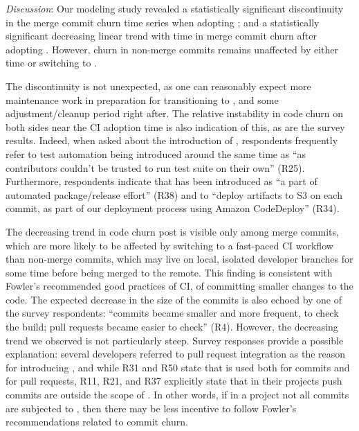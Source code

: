 

\smallskip\noindent \emph{Discussion}:
Our modeling study revealed a statistically significant discontinuity
in the merge commit churn time series when adopting \Tvis; and a statistically 
significant decreasing linear trend with time in merge commit churn after adopting \Tvis.
However, churn in non-merge commits remains unaffected by either time or 
switching to \Tvis.

The discontinuity is not unexpected, as one can reasonably expect more 
maintenance work in preparation for transitioning to \Tvis, 
and some adjustment/cleanup period right after.
The relative instability in code churn on both sides near the CI adoption time is 
also indication of this, as are the survey results.  
Indeed, when asked about the introduction of \Tvis, respondents frequently refer 
to test automation being introduced around the same time as \Tvi ``as contributors 
couldn't be trusted to run test suite on their own'' (R25). Furthermore, respondents 
indicate that \Tvi has been introduced as ``a part of automated package/release 
effort'' (R38) and to ``deploy artifacts to S3 on each commit, as part of our 
deployment process using Amazon CodeDeploy'' (R34).

The decreasing trend in code churn post \Tvi is visible only among merge commits,
which are more likely to be affected by switching to a fast-paced CI workflow than
non-merge commits, which may live on local, isolated developer branches for
some time before being merged to the remote.
This finding is consistent with Fowler's recommended good practices of CI, of 
committing smaller changes to the code.
The expected decrease in the size of the commits is also echoed by one of the 
survey respondents: ``commits became smaller and more frequent, to check 
the build; pull requests became easier to check'' (R4).
However, the decreasing trend we observed is not particularly steep.
Survey responses provide a possible explanation: several developers 
referred to pull request integration as the reason for introducing \Tvis, and 
while R31 and R50 state that \Tvis is used both for commits and for pull 
requests, R11, R21, and R37 explicitly state that 
in their projects push commits are outside the scope of \Tvis.
In other words, if in a project not all commits are subjected to \Tvis, then 
there may be less incentive to follow Fowler's recommendations 
related to commit churn.

